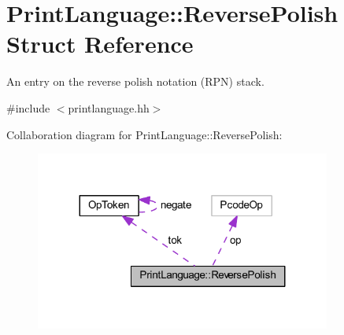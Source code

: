 \hypertarget{struct_print_language_1_1_reverse_polish}{}\section{Print\+Language\+::Reverse\+Polish Struct Reference}
\label{struct_print_language_1_1_reverse_polish}


An entry on the reverse polish notation (R\+PN) stack.  




{\ttfamily \#include $<$printlanguage.\+hh$>$}



Collaboration diagram for Print\+Language\+::Reverse\+Polish\+:
\nopagebreak
\begin{figure}[H]
\begin{center}
\leavevmode
\includegraphics[width=275pt]{struct_print_language_1_1_reverse_polish__coll__graph}
\end{center}
\end{figure}
